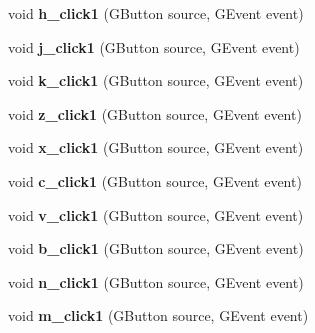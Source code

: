 \begin{DoxyCompactItemize}
\item 
\hypertarget{classkeyplayer__gui_a414dc2d40065691c22cef81f15ce448c}{void {\bfseries h\+\_\+click1} (G\+Button source, G\+Event event)}\label{classkeyplayer__gui_a414dc2d40065691c22cef81f15ce448c}

\item 
\hypertarget{classkeyplayer__gui_af295b8c28f5346dd5481a892c2aa8742}{void {\bfseries j\+\_\+click1} (G\+Button source, G\+Event event)}\label{classkeyplayer__gui_af295b8c28f5346dd5481a892c2aa8742}

\item 
\hypertarget{classkeyplayer__gui_ad1112af5917ef5893f3a74c12d3b4033}{void {\bfseries k\+\_\+click1} (G\+Button source, G\+Event event)}\label{classkeyplayer__gui_ad1112af5917ef5893f3a74c12d3b4033}

\item 
\hypertarget{classkeyplayer__gui_a9358671feb3647c62320f4ed0494c679}{void {\bfseries z\+\_\+click1} (G\+Button source, G\+Event event)}\label{classkeyplayer__gui_a9358671feb3647c62320f4ed0494c679}

\item 
\hypertarget{classkeyplayer__gui_a1e0d6a4fc310c0ab5b224926752dd311}{void {\bfseries x\+\_\+click1} (G\+Button source, G\+Event event)}\label{classkeyplayer__gui_a1e0d6a4fc310c0ab5b224926752dd311}

\item 
\hypertarget{classkeyplayer__gui_a8249626935c9c8f0b936eb33ff1f0574}{void {\bfseries c\+\_\+click1} (G\+Button source, G\+Event event)}\label{classkeyplayer__gui_a8249626935c9c8f0b936eb33ff1f0574}

\item 
\hypertarget{classkeyplayer__gui_af7978615d001865ba873dac37833bc5f}{void {\bfseries v\+\_\+click1} (G\+Button source, G\+Event event)}\label{classkeyplayer__gui_af7978615d001865ba873dac37833bc5f}

\item 
\hypertarget{classkeyplayer__gui_a833e7299355e68fcf35adb3734a1b600}{void {\bfseries b\+\_\+click1} (G\+Button source, G\+Event event)}\label{classkeyplayer__gui_a833e7299355e68fcf35adb3734a1b600}

\item 
\hypertarget{classkeyplayer__gui_a85031d9dedc3f0e846cf5e141f40c61c}{void {\bfseries n\+\_\+click1} (G\+Button source, G\+Event event)}\label{classkeyplayer__gui_a85031d9dedc3f0e846cf5e141f40c61c}

\item 
\hypertarget{classkeyplayer__gui_aee327a5948eef77ba8f2609023b65794}{void {\bfseries m\+\_\+click1} (G\+Button source, G\+Event event)}\label{classkeyplayer__gui_aee327a5948eef77ba8f2609023b65794}


\end{DoxyCompactItemize}
